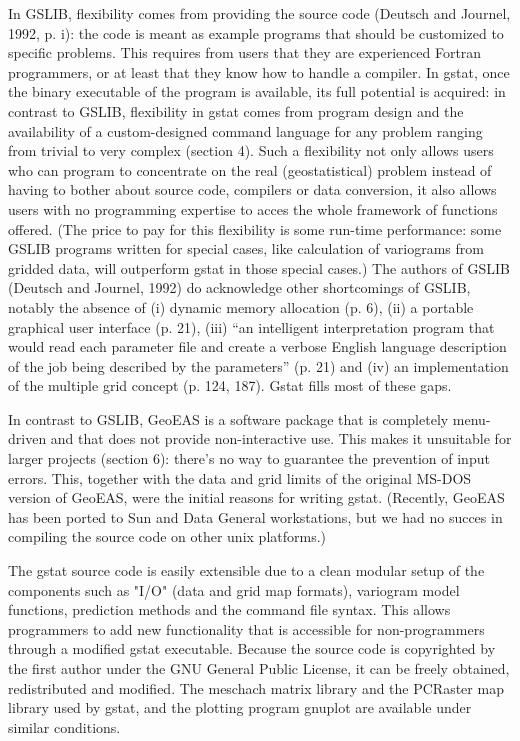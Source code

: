 \documentclass{article}
\begin{document}
In GSLIB, flexibility comes from providing the source code (Deutsch and
Journel, 1992, p. i): the code is meant as example programs that should
be customized to specific problems. This requires from users that they
are experienced Fortran programmers, or at least that they know how to
handle a compiler. In gstat, once the binary executable of the program
is available, its full potential is acquired: in contrast to GSLIB,
flexibility in gstat comes from program design and the availability of a
custom-designed command language for any problem ranging from trivial to
very complex (section 4). Such a flexibility not only allows users who
can program to concentrate on the real (geostatistical) problem instead
of having to bother about source code, compilers or data conversion, it
also allows users with no programming expertise to acces the whole
framework of functions offered. (The price to pay for this flexibility
is some run-time performance: some GSLIB programs written for special
cases, like calculation of variograms from gridded data, will outperform
gstat in those special cases.) The authors of GSLIB (Deutsch and
Journel, 1992) do acknowledge other shortcomings of GSLIB, notably the
absence of (i) dynamic memory allocation (p. 6), (ii) a portable
graphical user interface (p. 21), (iii) ``an intelligent interpretation
program that would read each parameter file and create a verbose English
language description of the job being described by the parameters'' (p.
21) and (iv) an implementation of the multiple grid concept (p. 124,
187). Gstat fills most of these gaps.

In contrast to GSLIB, GeoEAS is a software package that is completely
menu-driven and that does not provide non-interactive use. This makes it
unsuitable for larger projects (section 6): there's no way to guarantee
the prevention of input errors. This, together with the data and grid
limits of the original MS-DOS version of GeoEAS, were the initial
reasons for writing gstat. (Recently, GeoEAS has been ported to Sun and
Data General workstations, but we had no succes in compiling the source
code on other unix platforms.)

The gstat source code is easily extensible due to a clean modular setup
of the components such as "I/O" (data and grid map formats), variogram
model functions, prediction methods and the command file syntax. This
allows programmers to add new functionality that is accessible for
non-programmers through a modified gstat executable. Because the source
code is copyrighted by the first author under the GNU General Public
License, it can be freely obtained, redistributed and modified. The
meschach matrix library and the PCRaster map library used by gstat, and
the plotting program gnuplot are available under similar conditions.
\end{document}
